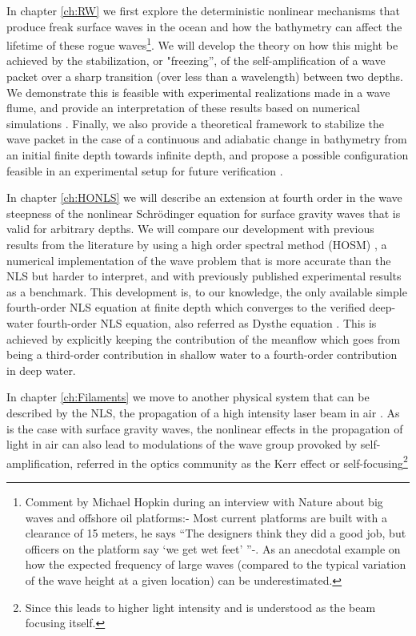 In chapter \ref{ch:RW} we first explore the deterministic nonlinear mechanisms that produce freak  surface waves in the ocean and how the bathymetry can affect the lifetime of these rogue waves\footnote{Comment by Michael Hopkin during an interview with Nature \citep{Hopkin2004} about big waves and offshore oil platforms:-
	Most current platforms are built with a
	clearance of 15 meters, he says “The designers
	think they did a good job, but officers on the
	platform say ‘we get wet feet’ ''-. As an anecdotal example on how the expected frequency of large waves (compared to the typical variation of the wave height at a given location) can be underestimated.}.
We will develop the theory on how this might be achieved by the stabilization, or "freezing'', of the self-amplification  of a wave packet over a sharp transition (over less than a wavelength) between two depths.
We demonstrate this is feasible with experimental realizations made in a wave flume, and provide an interpretation of these results based on numerical simulations \citep{Gomel2021}. 
Finally, we also provide a theoretical framework to stabilize the wave packet in the case of a continuous and adiabatic change in bathymetry from an initial finite depth towards infinite depth, and propose a possible configuration feasible in an experimental setup for future verification \citep{Armaroli2020}. 

In chapter \ref{ch:HONLS} we will describe an extension  at fourth order in the wave steepness of the nonlinear Schrödinger equation  for surface gravity waves that is valid for arbitrary depths.
We will compare our development with previous results from the literature by using a high order spectral method (HOSM) \citep{Clamond2006}, a numerical implementation of the wave problem that is more accurate than the NLS \citep{lunser22} but harder to interpret, and with previously published experimental results as a benchmark. 
This development is, to our knowledge, the only available  simple fourth-order NLS equation at finite depth which converges to the verified deep-water fourth-order NLS equation, also referred as Dysthe equation \citep{Janssen1983}.
This is achieved by explicitly keeping the contribution of the meanflow which goes from being a third-order  contribution in shallow water  to a fourth-order contribution in deep water.

In chapter \ref{ch:Filaments} we move to another physical  system that can be described by the NLS, the propagation of a high intensity laser beam in air \citep{Fibich2015,Boyd2008}.
As is the case with surface gravity waves, the nonlinear effects in the propagation of light in air can also lead to modulations of the wave group provoked by self-amplification,  referred in the optics community as the Kerr effect or self-focusing\footnote{Since this leads to higher light intensity and is understood as the beam focusing itself.}

